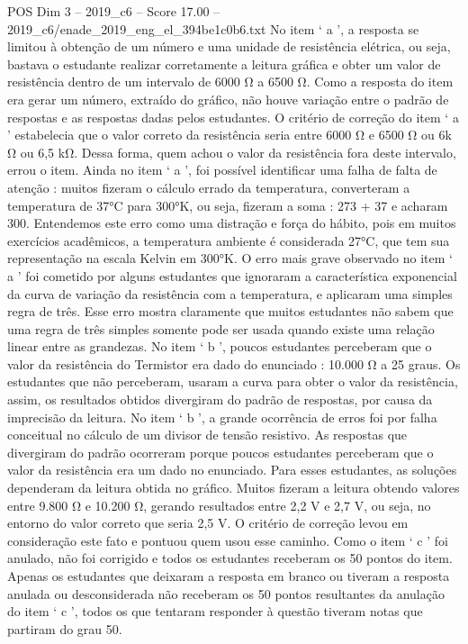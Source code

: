 \begin{textsample}{POS Dim 3 – 2019\_c6 – Score 17.00 – 2019\_c6/enade\_2019\_eng\_el\_394be1c0b6.txt}
No item ‘ a ’, a resposta se limitou à obtenção de um número e uma unidade de resistência elétrica, ou seja, bastava o estudante realizar corretamente a leitura gráfica e obter um valor de resistência dentro de um intervalo de 6000 Ω a 6500 Ω.
Como a resposta do item era gerar um número, extraído do gráfico, não houve variação entre o padrão de respostas e as respostas dadas pelos estudantes.
O critério de correção do item ‘ a ’ estabelecia que o valor correto da resistência seria entre 6000 Ω e 6500 Ω ou 6k Ω ou 6,5 kΩ.
Dessa forma, quem achou o valor da resistência fora deste intervalo, errou o item.
Ainda no item ‘ a ’, foi possível identificar uma falha de falta de atenção : muitos fizeram o cálculo errado da temperatura, converteram a temperatura de 37{\EmojiFont °}C para 300{\EmojiFont °}K, ou seja, fizeram a soma : 273 + 37 e acharam 300.
Entendemos este erro como uma distração e força do hábito, pois em muitos exercícios acadêmicos, a temperatura ambiente é considerada 27{\EmojiFont °}C, que tem sua representação na escala Kelvin em 300{\EmojiFont °}K.
O erro mais grave observado no item ‘ a ’ foi cometido por alguns estudantes que ignoraram a característica exponencial da curva de variação da resistência com a temperatura, e aplicaram uma simples regra de três.
Esse erro mostra claramente que muitos estudantes não sabem que uma regra de três simples somente pode ser usada quando existe uma relação linear entre as grandezas.
No item ‘ b ’, poucos estudantes perceberam que o valor da resistência do Termistor era dado do enunciado : 10.000 Ω a 25 graus.
Os estudantes que não perceberam, usaram a curva para obter o valor da resistência, assim, os resultados obtidos divergiram do padrão de respostas, por causa da imprecisão da leitura.
No item ‘ b ’, a grande ocorrência de erros foi por falha conceitual no cálculo de um divisor de tensão resistivo.
As respostas que divergiram do padrão ocorreram porque poucos estudantes perceberam que o valor da resistência era um dado no enunciado.
Para esses estudantes, as soluções dependeram da leitura obtida no gráfico.
Muitos fizeram a leitura obtendo valores entre 9.800 Ω e 10.200 Ω, gerando resultados entre 2,2 V e 2,7 V, ou seja, no entorno do valor correto que seria 2,5 V.
O critério de correção levou em consideração este fato e pontuou quem usou esse caminho.
Como o item ‘ c ’ foi anulado, não foi corrigido e todos os estudantes receberam os 50 pontos do item.
Apenas os estudantes que deixaram a resposta em branco ou tiveram a resposta anulada ou desconsiderada não receberam os 50 pontos resultantes da anulação do item ‘ c ’, todos os que tentaram responder à questão tiveram notas que partiram do grau 50.

\end{textsample}
